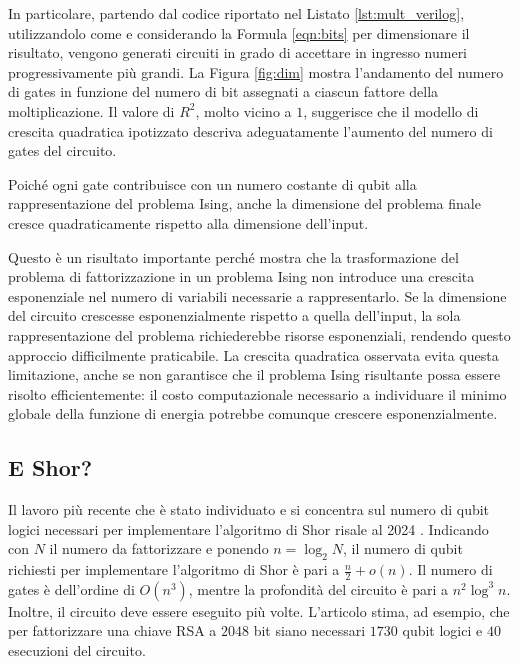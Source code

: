 \documentclass[]{article}
\begin{document}
	
	
	In particolare, partendo dal codice riportato nel Listato \ref{lst:mult_verilog}, utilizzandolo come  e considerando la Formula \ref{eqn:bits} per dimensionare il risultato, vengono generati circuiti in grado di accettare in ingresso numeri progressivamente più grandi. La Figura \ref{fig:dim} mostra l'andamento del numero di gates in funzione del numero di bit assegnati a ciascun fattore della moltiplicazione. Il valore di $R^2$, molto vicino a $1$, suggerisce che il modello di crescita quadratica ipotizzato descriva adeguatamente l'aumento del numero di gates del circuito.
	
	Poiché ogni gate contribuisce con un numero costante di qubit alla rappresentazione del problema Ising, anche la dimensione del problema finale cresce quadraticamente rispetto alla dimensione dell'input.
	
	Questo è un risultato importante perché mostra che la trasformazione del problema di fattorizzazione in un problema Ising non introduce una crescita esponenziale nel numero di variabili necessarie a rappresentarlo. Se la dimensione del circuito crescesse esponenzialmente rispetto a quella dell'input, la sola rappresentazione del problema richiederebbe risorse esponenziali, rendendo questo approccio difficilmente praticabile. La crescita quadratica osservata evita questa limitazione, anche se non garantisce che il problema Ising risultante possa essere risolto efficientemente: il costo computazionale necessario a individuare il minimo globale della funzione di energia potrebbe comunque crescere esponenzialmente.
	
	\subsection{E Shor?}
	
	Il lavoro più recente che è stato individuato e si concentra sul numero di qubit logici necessari per implementare l'algoritmo di Shor risale al 2024 \cite{chevignard2025reducing}. Indicando con $N$ il numero da fattorizzare e ponendo $n = \log_2 N$, il numero di qubit richiesti per implementare l'algoritmo di Shor è pari a $\frac{n}{2} + o(n)$. Il numero di gates è dell'ordine di $O(n^3)$, mentre la profondità del circuito è pari a $n^2 \log^3 n$. Inoltre, il circuito deve essere eseguito più volte. L'articolo stima, ad esempio, che per fattorizzare una chiave RSA a $2048$ bit siano necessari $1730$ qubit logici e $40$ esecuzioni del circuito.
	
\end{document}
